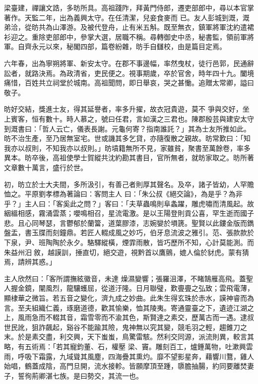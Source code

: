 \begin{pinyinscope}
 梁臺建，禪讓文誥，多昉所具。高祖踐阼，拜黃門侍郎，遷吏部郎中，尋以本官掌著作。天監二年，出為義興太守。在任清潔，兒妾食麥而
 已。友人彭城到溉，溉弟洽，從昉共為山澤游。及被代登舟，止有米五斛。既至無衣，鎮軍將軍沈約遣裙衫迎之。重除吏部郎中，參掌大選，居職不稱。尋轉御史中丞，秘書監，領前軍將軍。自齊永元以來，秘閣四部，篇卷紛雜，昉手自讎校，由是篇目定焉。



 六年春，出為寧朔將軍、新安太守。在郡不事邊幅，率然曳杖，徒行邑郭，民通辭訟者，就路決焉。為政清省，吏民便之。視事期歲，卒於官舍，時年四十九。闔境痛惜，百姓共立祠堂於城南。高祖聞問，即日舉哀，哭之甚慟。追贈太常卿，謚曰敬子。



 昉好交結，獎進士友，得其延譽者，率多升擢，故衣冠貴遊，莫不
 爭與交好，坐上賓客，恒有數十。時人慕之，號曰任君，言如漢之三君也。陳郡殷芸與建安太守到溉書曰：「哲人云亡，儀表長謝。元龜何寄？指南誰託？」其為士友所推如此。昉不治生產，至乃居無室宅。世或譏其多乞貸，亦隨復散之親故。昉常歎曰：「知我亦以叔則，不知我亦以叔則。」昉墳籍無所不見，家雖貧，聚書至萬餘卷，率多異本。昉卒後，高祖使學士賀縱共沈約勘其書目，官所無者，就昉家取之。昉所著文章數十萬言，盛行於世。



 初，昉立於士大夫間，多所汲引，有善己者則厚其聲名。及卒，諸子皆幼，人罕贍恤之。平原劉孝標為著論曰：客問主人
 曰：「朱公叔《絕交論》，為是乎？為非乎？」主人曰：「客奚此之問？」客曰：「夫草蟲鳴則阜螽躍，雕虎嘯而清風起。故絪縕相感，霧涌雲蒸；嚶鳴相召，星流電激。是以王陽登則貢公喜，罕生逝而國子悲。且心同琴瑟，言鬱郁於蘭簹，道葉膠漆，志婉孌於塤篪。聖賢以此鏤金版而鐫盤盂，書玉牒而刻鐘鼎。若匠人輟成風之妙巧，伯牙息流波之雅引。范、張款款於下泉，尹、班陶陶於永夕。駱驛縱橫，煙霏雨散，皆巧歷所不知，心計莫能測。而朱益州汨敘，越謨訓，捶直切，絕交遊，視黔首以鷹鸇，媲人倫於豺虎。蒙有猜焉，請辨其惑。」



 主人欣然曰：「客所謂撫絃徽音，未達
 燥濕變響；張羅沮澤，不睹鵠雁高飛。蓋聖人握金鏡，闡風烈，龍驤蠖屈，從道汙隆。日月聯璧，歎亹亹之弘致；雲飛電薄，顯棣華之微旨。若五音之變化，濟九成之妙曲。此朱生得玄珠於赤水，謨神睿而為言。至夫組織仁義，琢磨道德，歡其愉樂，恤其陵夷。寄通靈臺之下，遺迹江湖之上，風雨急而不輟其音，霜雪零而不渝其色，斯賢達之素交，歷萬古而一遇。逮叔世民訛，狙詐飆起，谿谷不能踰其險，鬼神無以究其變，競毛羽之輕，趨錐刀之末。於是素交盡，利交興，天下蚩蚩，鳥驚雷駭。然利交同源，派流則異，較言其略，有五術焉：「若其寵鈞董、石，權壓
 梁、竇。雕刻百工，爐錘萬物，吐漱興雲雨，呼吸下霜露，九域聳其風塵，四海疊其熏灼。靡不望影星奔，藉響川鶩，雞人始唱，鶴蓋成陰，高門旦開，流水接軫。皆願摩頂至踵，隳膽抽腸，約同要離焚妻子，誓徇荊卿湛七族。是曰勢交，其流一也。




\end{pinyinscope}
